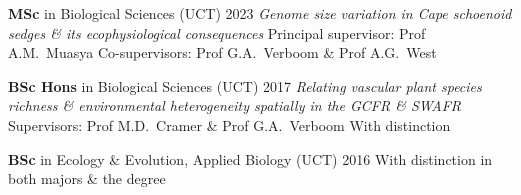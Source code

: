 \begin{hangparas}{2em}{1}

\textbf{MSc} in Biological Sciences (UCT)                     \hfill 2023 \break
\textit{Genome size variation in Cape schoenoid sedges
\& its ecophysiological consequences}                                     \break
Principal supervisor: Prof A.M.~Muasya                                    \break
Co-supervisors: Prof G.A.~Verboom \& Prof A.G.~West

\textbf{BSc Hons} in Biological Sciences (UCT)                \hfill 2017 \break
\textit{Relating vascular plant species richness \&
  environmental heterogeneity spatially in the GCFR \& SWAFR}             \break
Supervisors: Prof M.D.~Cramer \& Prof G.A.~Verboom                        \break
With distinction

\textbf{BSc} in Ecology \& Evolution, Applied Biology (UCT)   \hfill 2016 \break
With distinction in both majors \& the degree

\hfill

\end{hangparas}
